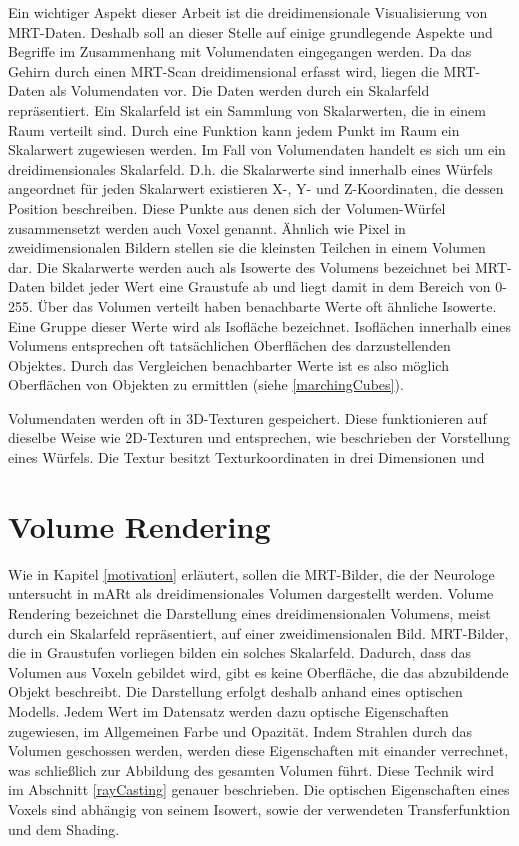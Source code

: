 Ein wichtiger Aspekt dieser Arbeit ist die dreidimensionale Visualisierung von MRT-Daten. Deshalb soll an dieser Stelle auf einige grundlegende Aspekte und Begriffe im Zusammenhang mit Volumendaten eingegangen werden. Da das Gehirn durch einen MRT-Scan dreidimensional erfasst wird, liegen die MRT-Daten als Volumendaten vor. Die Daten werden durch ein Skalarfeld repräsentiert. Ein Skalarfeld ist ein Sammlung von Skalarwerten, die in einem Raum verteilt sind. Durch eine Funktion kann jedem Punkt im Raum ein Skalarwert zugewiesen werden. Im Fall von Volumendaten handelt es sich um ein dreidimensionales Skalarfeld. D.h. die Skalarwerte sind innerhalb eines Würfels angeordnet für jeden Skalarwert existieren X-, Y- und Z-Koordinaten, die dessen Position beschreiben. 
Diese Punkte aus denen sich der Volumen-Würfel zusammensetzt werden auch Voxel genannt. Ähnlich wie Pixel in zweidimensionalen Bildern stellen sie die kleinsten Teilchen in einem Volumen dar. 
Die Skalarwerte werden auch als Isowerte des Volumens bezeichnet bei MRT-Daten bildet jeder Wert eine Graustufe ab und liegt damit in dem Bereich von 0-255. 
Über das Volumen verteilt haben benachbarte Werte oft ähnliche Isowerte. Eine Gruppe dieser Werte wird als Isofläche bezeichnet. Isoflächen innerhalb eines Volumens entsprechen oft tatsächlichen Oberflächen des darzustellenden Objektes. Durch das Vergleichen benachbarter Werte ist es also möglich Oberflächen von Objekten zu ermittlen (siehe \ref{marchingCubes}). 

Volumendaten werden oft in 3D-Texturen gespeichert. Diese funktionieren auf dieselbe Weise wie 2D-Texturen und entsprechen, wie beschrieben der Vorstellung eines Würfels. Die Textur besitzt Texturkoordinaten in drei Dimensionen und 

\section{Volume Rendering}							  %
Wie in Kapitel \ref{motivation} erläutert, sollen die MRT-Bilder, die der Neurologe untersucht in mARt als dreidimensionales Volumen dargestellt werden. Volume Rendering bezeichnet die Darstellung eines dreidimensionalen Volumens, meist durch ein Skalarfeld repräsentiert, auf einer zweidimensionalen Bild. MRT-Bilder, die in Graustufen vorliegen bilden ein solches Skalarfeld. 
Dadurch, dass das Volumen aus Voxeln gebildet wird, gibt es keine Oberfläche, die das abzubildende Objekt beschreibt. Die Darstellung erfolgt deshalb anhand eines optischen Modells. Jedem Wert im Datensatz werden dazu optische Eigenschaften zugewiesen, im Allgemeinen Farbe und Opazität. Indem Strahlen durch das Volumen geschossen werden, werden diese Eigenschaften mit einander verrechnet, was schließlich zur Abbildung des gesamten Volumen führt. Diese Technik wird im Abschnitt \ref{rayCasting} genauer beschrieben.
Die optischen Eigenschaften eines Voxels sind abhängig von seinem Isowert, sowie der verwendeten Transferfunktion und dem Shading. 

